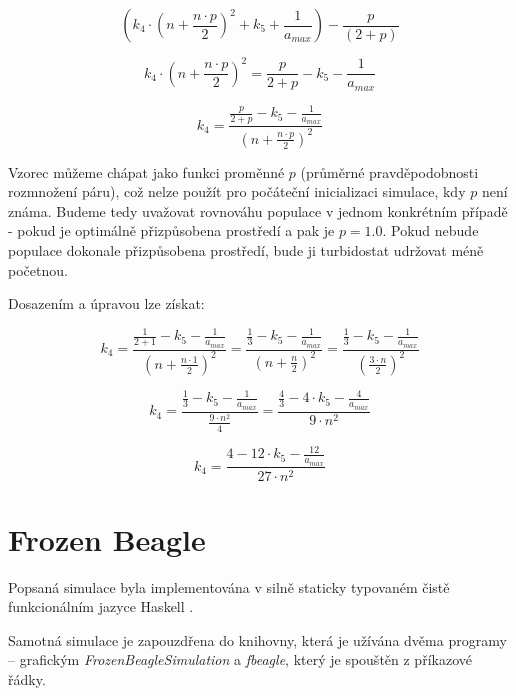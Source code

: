 \begin{equation}
(k_4\cdot{(n + \frac{n\cdot{}p}{2})^2} + {k_5} + \frac{1}{a_{max}}) - \frac{p}{(2 + p)}
\end{equation}

\begin{equation}
k_4\cdot{(n + \frac{n\cdot{}p}{2})^2} = \frac{p}{2 + p} -  {k_5} - \frac{1}{a_{max}}
\end{equation}

\begin{equation}
k_4  = \frac{\frac{p}{2 + p} -  {k_5} - \frac{1}{a_{max}}}{(n + \frac{n\cdot{}p}{2})^2}
\end{equation}


Vzorec můžeme chápat jako funkci proměnné $p$ (průměrné pravděpodobnosti rozmnožení páru), což nelze použít  pro
počáteční inicializaci simulace, kdy $p$ není známa. Budeme tedy uvažovat rovnováhu populace v jednom konkrétním
případě - pokud je optimálně přizpůsobena prostředí a pak je $p = 1.0$. Pokud nebude populace dokonale přizpůsobena
prostředí, bude ji turbidostat udržovat méně početnou.

Dosazením a úpravou lze získat:



\begin{equation}
k_4  = \frac{\frac{1}{2 + 1} -  {k_5} - \frac{1}{a_{max}}}{(n + \frac{n\cdot{}1}{2})^2}
     = \frac{\frac{1}{3} -  {k_5} - \frac{1}{a_{max}}}{(n + \frac{n}{2})^2}
     = \frac{\frac{1}{3} -  {k_5} - \frac{1}{a_{max}}}{(\frac{3\cdot{}n}{2})^2}
\end{equation}

\begin{equation}
k_4  = \frac{\frac{1}{3} -  {k_5} - \frac{1}{a_{max}}}{\frac{9\cdot{}n^2}{4}}
     = \frac{\frac{4}{3} - 4\cdot{}{k_5} - \frac{4}{a_{max}}}{9\cdot{}n^2}
\end{equation}

\begin{equation}
k_4  = \frac{4 - 12\cdot{}{k_5} - \frac{12}{a_{max}}}{27\cdot{}n^2}
\end{equation}

\section{Frozen Beagle}

Popsaná simulace byla implementována v silně staticky typovaném čistě funkcionálním jazyce Haskell \citep{Haskell}.

Samotná simulace je zapouzdřena do knihovny, která je užívána dvěma programy -- grafickým
\textit{FrozenBeagleSimulation} a \textit{fbeagle}, který je spouštěn z příkazové řádky.

